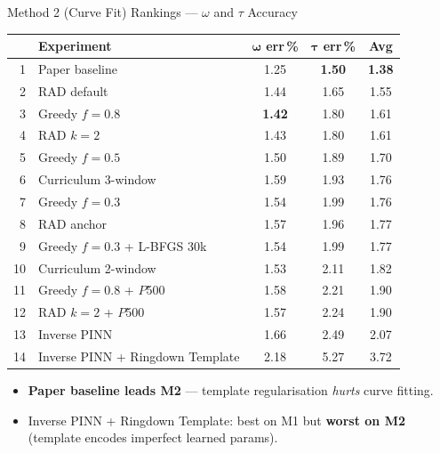 \documentclass[aspectratio=169, 11pt]{beamer}
\begin{document}
\begin{frame}{Method 2 (Curve Fit) Rankings --- $\omega$ and $\tau$ Accuracy}
  \begin{center}
    \scriptsize
    \begin{tabular}{@{}rlccc@{}}
      \toprule
      & \textbf{Experiment}
        & $\boldsymbol{\omega}$ \textbf{err\,\%}
        & $\boldsymbol{\tau}$ \textbf{err\,\%}
        & \textbf{Avg} \\
      \midrule
      \rowcolor{green!10}
      1  & Paper baseline                    & 1.25          & \textbf{1.50} & \textbf{1.38} \\
      2  & RAD default                       & 1.44          & 1.65          & 1.55 \\
      3  & Greedy $f\!=\!0.8$                & \textbf{1.42} & 1.80          & 1.61 \\
      4  & RAD $k\!=\!2$                     & 1.43          & 1.80          & 1.61 \\
      5  & Greedy $f\!=\!0.5$                & 1.50          & 1.89          & 1.70 \\
      6  & Curriculum 3-window               & 1.59          & 1.93          & 1.76 \\
      7  & Greedy $f\!=\!0.3$                & 1.54          & 1.99          & 1.76 \\
      8  & RAD anchor                        & 1.57          & 1.96          & 1.77 \\
      9  & Greedy $f\!=\!0.3$ + L-BFGS 30k  & 1.54          & 1.99          & 1.77 \\
      10 & Curriculum 2-window               & 1.53          & 2.11          & 1.82 \\
      11 & Greedy $f\!=\!0.8$ + $P$500       & 1.58          & 2.21          & 1.90 \\
      12 & RAD $k\!=\!2$ + $P$500            & 1.57          & 2.24          & 1.90 \\
      13 & Inverse PINN                      & 1.66          & 2.49          & 2.07 \\
      \rowcolor{red!5}
      14 & Inverse PINN + Ringdown Template       & 2.18          & 5.27          & 3.72 \\
      \bottomrule
    \end{tabular}
  \end{center}

  \smallskip
  \begin{itemize}\small
    \item \textbf{Paper baseline leads M2} --- template regularisation \emph{hurts} curve fitting.
    \item Inverse PINN + Ringdown Template: best on M1 but \textbf{worst on M2}
          (template encodes imperfect learned params).
  \end{itemize}
\end{frame}
\end{document}
